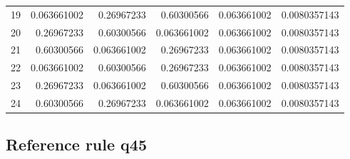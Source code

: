 \begin{table}[H]
\begin{tabular}{@{}rrrrrr@{}}
19 & 0.063661002 & 0.26967233 & 0.60300566 & 0.063661002 & 0.0080357143 \\
20 & 0.26967233 & 0.60300566 & 0.063661002 & 0.063661002 & 0.0080357143 \\
21 & 0.60300566 & 0.063661002 & 0.26967233 & 0.063661002 & 0.0080357143 \\
22 & 0.063661002 & 0.60300566 & 0.26967233 & 0.063661002 & 0.0080357143 \\
23 & 0.26967233 & 0.063661002 & 0.60300566 & 0.063661002 & 0.0080357143 \\
24 & 0.60300566 & 0.26967233 & 0.063661002 & 0.063661002 & 0.0080357143 \\
\bottomrule
\end{tabular}
\end{table}
\normalsize

\subsection*{Reference rule q45}
\tiny
